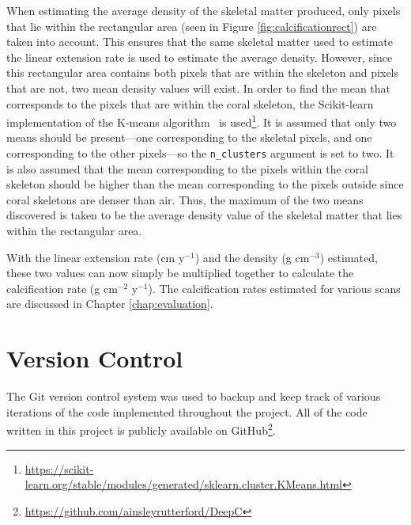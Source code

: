 When estimating the average density of the skeletal matter produced, only pixels that lie within the rectangular area (seen in Figure \ref{fig:calcificationrect}) are taken into account. This ensures that the same skeletal matter used to estimate the linear extension rate is used to estimate the average density. However, since this rectangular area contains both pixels that are within the skeleton and pixels that are not, two mean density values will exist. In order to find the mean that corresponds to the pixels that are within the coral skeleton, the Scikit-learn implementation of the K-means algorithm~\cite{kmeans} is used\footnote{\url{https://scikit-learn.org/stable/modules/generated/sklearn.cluster.KMeans.html}}. It is assumed that only two means should be present---one corresponding to the skeletal pixels, and one corresponding to the other pixels---so the \texttt{n\_clusters} argument is set to two. It is also assumed that the mean corresponding to the pixels within the coral skeleton should be higher than the mean corresponding to the pixels outside since coral skeletons are denser than air. Thus, the maximum of the two means discovered is taken to be the average density value of the skeletal matter that lies within the rectangular area.

With the linear extension rate (cm y$^{-1}$) and the density (g cm$^{-3}$) estimated, these two values can now simply be multiplied together to calculate the calcification rate (g cm$^{-2}$ y$^{-1}$). The calcification rates estimated for various scans are discussed in Chapter \ref{chap:evaluation}.

\section{Version Control}

The Git version control system was used to backup and keep track of various iterations of the code implemented throughout the project. All of the code written in this project is publicly available on GitHub\footnote{\url{https://github.com/ainsleyrutterford/DeepC}}. 
